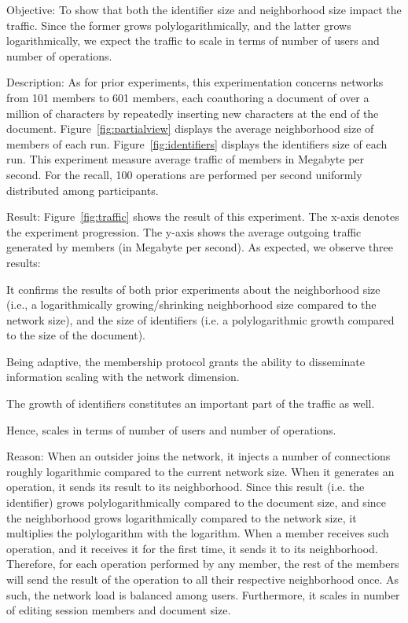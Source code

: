 \begin{asparadesc}
\item [Objective:] To show that both the identifier size and neighborhood size
  impact the traffic. Since the former grows polylogarithmically, and the latter
  grows logarithmically, we expect the traffic to scale in terms of number of
  users and number of operations.
\item [Description:] As for prior experiments, this experimentation concerns
  networks from 101 members to 601 members, each coauthoring a document of over
  a million of characters by repeatedly inserting new characters at the end of
  the document. Figure~\ref{fig:partialview} displays the average neighborhood
  size of members of each run. Figure~\ref{fig:identifiers} displays the
  identifiers size of each run. This experiment measure average traffic of
  members in Megabyte per second. For the recall, 100 operations are performed
  per second uniformly distributed among participants.
\item [Result:] Figure~\ref{fig:traffic} shows the result of this experiment.
  The x-axis denotes the experiment progression. The y-axis shows the average
  outgoing traffic generated by members (in Megabyte per second). As expected,
  we observe three results:
  \begin{inparaenum}[(i)]
  \item It confirms the results of both prior experiments about the neighborhood
    size (i.e., a logarithmically growing/shrinking neighborhood size compared
    to the network size), and the size of identifiers (i.e. a
    polylogarithmic growth compared to the size of the document).
  \item Being adaptive, the \SPRAY membership protocol grants the ability to
    disseminate information scaling with the network dimension.
  \item The growth of identifiers constitutes an important part of the traffic
    as well.
  \end{inparaenum}
  Hence, \CRATE scales in terms of number of users and number of operations.
\item [Reason:] When an outsider joins the network, it injects a number of
  connections roughly logarithmic compared to the current network size. When it
  generates an operation, it sends its result to its neighborhood. Since this
  result (i.e. the identifier) grows polylogarithmically compared to the
  document size, and since the neighborhood grows logarithmically compared to
  the network size, it multiplies the polylogarithm with the logarithm. When a
  member receives such operation, and it receives it for the first time, it
  sends it to its neighborhood. Therefore, for each operation performed by any
  member, the rest of the members will send the result of the operation to all
  their respective neighborhood once. As such, the network load is balanced
  among users. Furthermore, it scales in number of editing session members and
  document size.
\end{asparadesc}

